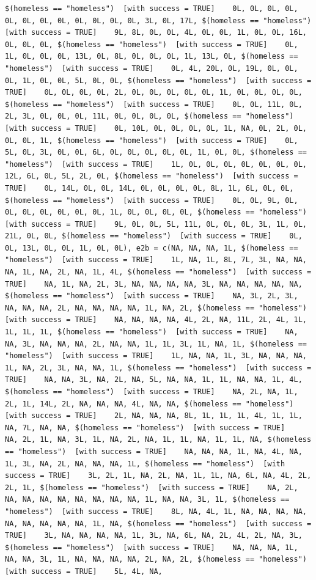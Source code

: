 \documentclass{tufte-book}\usepackage[]{graphicx}\usepackage[]{xcolor}
\makeatletter
\newenvironment{kframe}{%
 \def\at@end@of@kframe{}%
 \ifinner\ifhmode%
  \def\at@end@of@kframe{\end{minipage}}%
  \begin{minipage}{\columnwidth}%
 \fi\fi%
 \def\FrameCommand##1{\hskip\@totalleftmargin \hskip-\fboxsep
 \colorbox{shadecolor}{##1}\hskip-\fboxsep
     \hskip-\linewidth \hskip-\@totalleftmargin \hskip\columnwidth}%
 \MakeFramed {\advance\hsize-\width
   \@totalleftmargin\z@ \linewidth\hsize
   \@setminipage}}%
 {\par\unskip\endMakeFramed%
 \at@end@of@kframe}
\newenvironment{knitrout}{}{} %
\makeatother
\begin{document}
\begin{knitrout}
\begin{kframe}
\begin{verbatim}
$(homeless == "homeless")  [with success = TRUE]    0L, 0L, 0L, 0L, 0L, 0L, 0L, 0L, 0L, 0L, 0L, 0L, 3L, 0L, 17L, $(homeless == "homeless")  [with success = TRUE]    9L, 8L, 0L, 0L, 4L, 0L, 0L, 1L, 0L, 0L, 16L, 0L, 0L, 0L, $(homeless == "homeless")  [with success = TRUE]    0L, 1L, 0L, 0L, 0L, 13L, 0L, 8L, 0L, 0L, 0L, 1L, 13L, 0L, $(homeless == "homeless")  [with success = TRUE]    0L, 4L, 20L, 0L, 19L, 0L, 0L, 0L, 1L, 0L, 0L, 5L, 0L, 0L, $(homeless == "homeless")  [with success = TRUE]    0L, 0L, 0L, 0L, 2L, 0L, 0L, 0L, 0L, 0L, 1L, 0L, 0L, 0L, 0L, $(homeless == "homeless")  [with success = TRUE]    0L, 0L, 11L, 0L, 2L, 3L, 0L, 0L, 0L, 11L, 0L, 0L, 0L, 0L, $(homeless == "homeless")  [with success = TRUE]    0L, 10L, 0L, 0L, 0L, 0L, 1L, NA, 0L, 2L, 0L, 0L, 0L, 1L, $(homeless == "homeless")  [with success = TRUE]    0L, 5L, 0L, 3L, 0L, 0L, 6L, 0L, 0L, 0L, 0L, 0L, 1L, 0L, 0L, $(homeless == "homeless")  [with success = TRUE]    1L, 0L, 0L, 0L, 0L, 0L, 0L, 0L, 12L, 6L, 0L, 5L, 2L, 0L, $(homeless == "homeless")  [with success = TRUE]    0L, 14L, 0L, 0L, 14L, 0L, 0L, 0L, 0L, 8L, 1L, 6L, 0L, 0L, $(homeless == "homeless")  [with success = TRUE]    0L, 0L, 9L, 0L, 0L, 0L, 0L, 0L, 0L, 0L, 1L, 0L, 0L, 0L, 0L, $(homeless == "homeless")  [with success = TRUE]    9L, 0L, 0L, 5L, 11L, 0L, 0L, 0L, 3L, 1L, 0L, 21L, 0L, 0L, $(homeless == "homeless")  [with success = TRUE]    0L, 0L, 13L, 0L, 0L, 1L, 0L, 0L), e2b = c(NA, NA, NA, 1L, $(homeless == "homeless")  [with success = TRUE]    1L, NA, 1L, 8L, 7L, 3L, NA, NA, NA, 1L, NA, 2L, NA, 1L, 4L, $(homeless == "homeless")  [with success = TRUE]    NA, 1L, NA, 2L, 3L, NA, NA, NA, NA, 3L, NA, NA, NA, NA, NA, $(homeless == "homeless")  [with success = TRUE]    NA, 3L, 2L, 3L, NA, NA, NA, 2L, NA, NA, NA, NA, 1L, NA, 2L, $(homeless == "homeless")  [with success = TRUE]    NA, NA, NA, NA, 4L, 2L, NA, 11L, 2L, 4L, 1L, 1L, 1L, 1L, $(homeless == "homeless")  [with success = TRUE]    NA, NA, 3L, NA, NA, NA, 2L, NA, NA, 1L, 1L, 3L, 1L, NA, 1L, $(homeless == "homeless")  [with success = TRUE]    1L, NA, NA, 1L, 3L, NA, NA, NA, 1L, NA, 2L, 3L, NA, NA, 1L, $(homeless == "homeless")  [with success = TRUE]    NA, NA, 3L, NA, 2L, NA, 5L, NA, NA, 1L, 1L, NA, NA, 1L, 4L, $(homeless == "homeless")  [with success = TRUE]    NA, 2L, NA, 1L, 2L, 1L, 14L, 2L, NA, NA, NA, 4L, NA, NA, $(homeless == "homeless")  [with success = TRUE]    2L, NA, NA, NA, 8L, 1L, 1L, 1L, 4L, 1L, 1L, NA, 7L, NA, NA, $(homeless == "homeless")  [with success = TRUE]    NA, 2L, 1L, NA, 3L, 1L, NA, 2L, NA, 1L, 1L, NA, 1L, 1L, NA, $(homeless == "homeless")  [with success = TRUE]    NA, NA, NA, 1L, NA, 4L, NA, 1L, 3L, NA, 2L, NA, NA, NA, 1L, $(homeless == "homeless")  [with success = TRUE]    3L, 2L, 1L, NA, 2L, NA, 1L, 1L, NA, 6L, NA, 4L, 2L, 2L, 1L, $(homeless == "homeless")  [with success = TRUE]    NA, 2L, NA, NA, NA, NA, NA, NA, NA, NA, 1L, NA, NA, 3L, 1L, $(homeless == "homeless")  [with success = TRUE]    8L, NA, 4L, 1L, NA, NA, NA, NA, NA, NA, NA, NA, NA, 1L, NA, $(homeless == "homeless")  [with success = TRUE]    3L, NA, NA, NA, NA, 1L, 3L, NA, 6L, NA, 2L, 4L, 2L, NA, 3L, $(homeless == "homeless")  [with success = TRUE]    NA, NA, NA, 1L, NA, NA, 3L, 1L, NA, NA, NA, NA, 2L, NA, 2L, $(homeless == "homeless")  [with success = TRUE]    5L, 4L, NA, 
\end{verbatim}
\end{kframe}
\end{knitrout}
\end{document}
